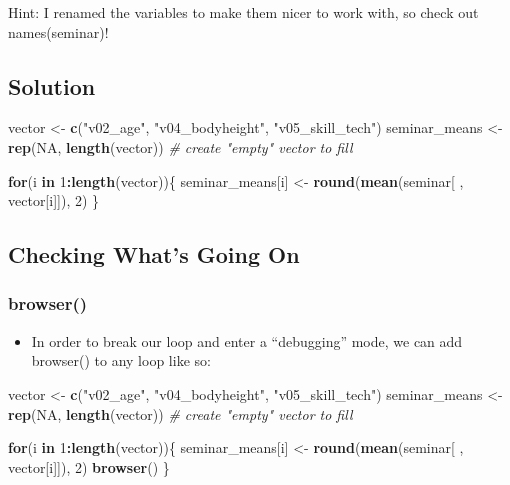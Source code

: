 \documentclass[
]{book}
\newenvironment{Shaded}{\begin{snugshade}}{\end{snugshade}}
\newcommand{\CommentTok}[1]{\textcolor[rgb]{0.56,0.35,0.01}{\textit{#1}}}
\newcommand{\ConstantTok}[1]{\textcolor[rgb]{0.56,0.35,0.01}{#1}}
\newcommand{\ControlFlowTok}[1]{\textcolor[rgb]{0.13,0.29,0.53}{\textbf{#1}}}
\newcommand{\DecValTok}[1]{\textcolor[rgb]{0.00,0.00,0.81}{#1}}
\newcommand{\FunctionTok}[1]{\textcolor[rgb]{0.13,0.29,0.53}{\textbf{#1}}}
\newcommand{\NormalTok}[1]{#1}
\newcommand{\OtherTok}[1]{\textcolor[rgb]{0.56,0.35,0.01}{#1}}
\newcommand{\SpecialCharTok}[1]{\textcolor[rgb]{0.81,0.36,0.00}{\textbf{#1}}}
\newcommand{\StringTok}[1]{\textcolor[rgb]{0.31,0.60,0.02}{#1}}
\providecommand{\tightlist}{%
  \setlength{\itemsep}{0pt}\setlength{\parskip}{0pt}}
\begin{document}
Hint: I renamed the variables to make them nicer to work with, so check out names(seminar)!

\subsection{Solution}\label{solution-7}

\begin{Shaded}
\begin{Highlighting}[]
\NormalTok{vector }\OtherTok{\textless{}{-}} \FunctionTok{c}\NormalTok{(}\StringTok{"v02\_age"}\NormalTok{, }\StringTok{"v04\_bodyheight"}\NormalTok{, }\StringTok{"v05\_skill\_tech"}\NormalTok{)}
\NormalTok{seminar\_means }\OtherTok{\textless{}{-}} \FunctionTok{rep}\NormalTok{(}\ConstantTok{NA}\NormalTok{, }\FunctionTok{length}\NormalTok{(vector)) }\CommentTok{\# create "empty" vector to fill}

\ControlFlowTok{for}\NormalTok{(i }\ControlFlowTok{in} \DecValTok{1}\SpecialCharTok{:}\FunctionTok{length}\NormalTok{(vector))\{}
\NormalTok{  seminar\_means[i] }\OtherTok{\textless{}{-}} \FunctionTok{round}\NormalTok{(}\FunctionTok{mean}\NormalTok{(seminar[ , vector[i]]), }\DecValTok{2}\NormalTok{)}
\NormalTok{\}}
\end{Highlighting}
\end{Shaded}

\subsection{Checking What's Going On}\label{checking-whats-going-on}

\subsubsection{browser()}\label{browser}

\begin{itemize}
\tightlist
\item
  In order to break our loop and enter a ``debugging'' mode, we can add browser() to any loop like so:
\end{itemize}

\begin{Shaded}
\begin{Highlighting}[]
\NormalTok{vector }\OtherTok{\textless{}{-}} \FunctionTok{c}\NormalTok{(}\StringTok{"v02\_age"}\NormalTok{, }\StringTok{"v04\_bodyheight"}\NormalTok{, }\StringTok{"v05\_skill\_tech"}\NormalTok{)}
\NormalTok{seminar\_means }\OtherTok{\textless{}{-}} \FunctionTok{rep}\NormalTok{(}\ConstantTok{NA}\NormalTok{, }\FunctionTok{length}\NormalTok{(vector)) }\CommentTok{\# create "empty" vector to fill}

\ControlFlowTok{for}\NormalTok{(i }\ControlFlowTok{in} \DecValTok{1}\SpecialCharTok{:}\FunctionTok{length}\NormalTok{(vector))\{}
\NormalTok{  seminar\_means[i] }\OtherTok{\textless{}{-}} \FunctionTok{round}\NormalTok{(}\FunctionTok{mean}\NormalTok{(seminar[ , vector[i]]), }\DecValTok{2}\NormalTok{)}
  \FunctionTok{browser}\NormalTok{()}
\NormalTok{\}}
\end{Highlighting}
\end{Shaded}
\end{document}
